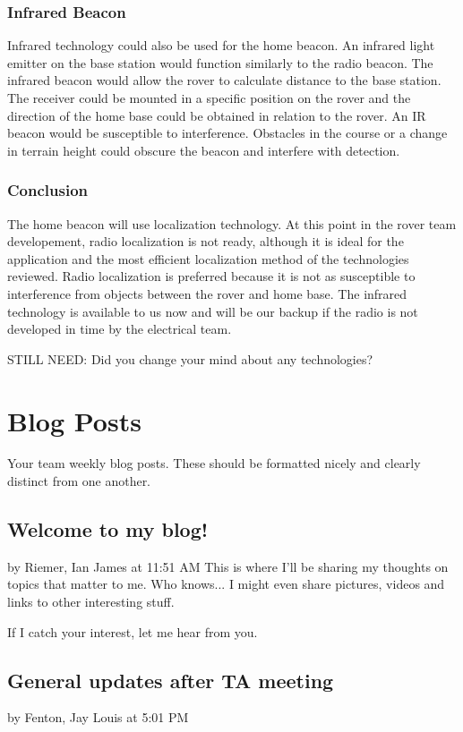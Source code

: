 \documentclass[10pt, oneside,onecolumn]{IEEEtran}
\begin{document}
\subsubsection{Infrared Beacon}

	Infrared technology could also be used for the home beacon. An infrared light emitter on the base station would function similarly to the radio beacon. The infrared beacon would allow the rover to calculate distance to the base station. The receiver could be mounted in a specific position on the rover and the direction of the home base could be obtained in relation to the rover. An IR beacon would be susceptible to interference. Obstacles in the course or a change in terrain height could obscure the beacon and interfere with detection. 

\subsubsection{Conclusion}

	The home beacon will use localization technology. At this point in the rover team developement, radio localization is not ready, although it is ideal for the application and the most efficient localization method of the technologies reviewed. Radio localization is preferred because it is not as susceptible to interference from objects between the rover and home base. The infrared technology is available to us now and will be our backup if the radio is not developed in time by the electrical team. 

STILL NEED: Did you change your mind about any technologies?

\section{Blog Posts}

Your team weekly blog posts. These should be formatted nicely and clearly distinct from one another.

\subsection{Welcome to my blog!}
by Riemer, Ian James at 11:51 AM
This is where I'll be sharing my thoughts on topics that matter to me. Who knows... I might even share pictures, videos and links to other interesting stuff.

If I catch your interest, let me hear from you.


\subsection{General updates after TA meeting}
by Fenton, Jay Louis at 5:01 PM
\end{document}
